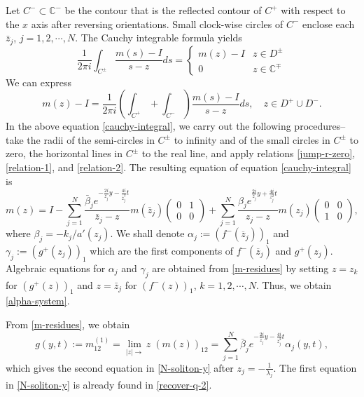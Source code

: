 \documentclass[11pt]{article}
\newcommand{\CC}{{\mathbb C}}
\begin{document}
Let $C^-\subset \CC^-$ be the contour that is the reflected contour of $C^+$ with respect to the $x$ axis after reversing orientations. Small clock-wise circles of $C^-$ enclose each $\bar{z}_j$, $j=1,2,\cdots,N$. The Cauchy integrable formula yields
$$\frac{1}{2\pi i}\int_{C^{\pm}}\frac{m(s)-I}{s-z}ds=\left\{ \begin{matrix} m(z)-I & z \in D^{\pm}
\\ 0 & z \in \CC^{\mp} \end{matrix}\right.
$$
We can express 
\begin{equation} \label{cauchy-integral}
m(z)-I=\frac{1}{2\pi i}\left(\int_{C^{+}}+\int_{C^{-}}\right)\frac{m(s)-I}{s-z}ds, \quad z\in D^+\cup D^-.
\end{equation}
In the above equation \eqref{cauchy-integral}, we carry out the following procedures--take the radii of the semi-circles in $C^{\pm}$ to infinity and of the small circles in $C^{\pm}$ to zero, the horizontal lines in $C^{\pm}$ to the real line, and apply relations \eqref{jump-r-zero}, \eqref{relation-1}, and \eqref{relation-2}. The resulting equation of equation \eqref{cauchy-integral} is  
\begin{equation} \label{m-residues}
m(z)=I-\sum_{j=1}^N\frac{\bar{\beta}_j e^{-\frac{2i}{\bar{z}_j}y-\frac{4i}{\bar{z}_j^2}t}}{\bar{z}_j-z}m(\bar{z}_j)\begin{pmatrix} 0 & 1 \\ 0 & 0\end{pmatrix}+\sum_{j=1}^N\frac{\beta_j e^{\frac{2i}{z_j}y+\frac{4i}{z_j^2}t}}{z_j-z}m(z_j)\begin{pmatrix} 0 & 0 \\ 1 & 0\end{pmatrix},
\end{equation}
where $\beta_j=-k_j/a'(z_j)$. 
We shall denote $\alpha_j:=(f^-(\overline{z}_j))_1$ and $\gamma_j:=(g^+(z_j))_1$ which are the first components of $f^-(\overline{z}_j)$ and $g^+(z_j)$. Algebraic equations for $\alpha_j$ and $\gamma_j$ are obtained from \eqref{m-residues} by setting $z=z_k$ for $(g^+(z))_1$ and $z=\bar{z}_j$ for $(f^-(z))_1$, $k=1,2,\cdots,N$. Thus, we obtain \eqref{alpha-system}.


From \eqref{m-residues}, we obtain
$$g(y,t):=m_{12}^{(1)}=\lim_{|z|\rightarrow}z\;(m(z))_{12}=\sum_{j=1}^N\bar{\beta}_j e^{-\frac{2i}{\bar{z}_j}y-\frac{4i}{\bar{z}_j^2}t} \alpha_j(y,t),$$
which gives the second equation in \eqref{N-soliton-y} after $z_j=-\frac{1}{\lambda_j}$. The first equation in \eqref{N-soliton-y} is already found in \eqref{recover-q-2}. 
 
\end{document}
